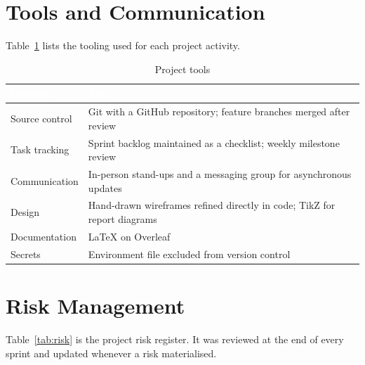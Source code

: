 \documentclass[12pt,a4paper,oneside]{report}
\begin{document}
\section{Tools and Communication}

Table~\ref{tab:tools} lists the tooling used for each project activity.

\begin{table}[H]
\centering
\caption{Project tools}
\label{tab:tools}
\small
\begin{tabularx}{\textwidth}{@{}p{3.6cm}X@{}}
\toprule
\rowcolor{tblhead} \textcolor{white}{\textbf{Purpose}} & \textcolor{white}{\textbf{Tool}} \\
\midrule
Source control & Git with a GitHub repository; feature branches merged after review \\
Task tracking  & Sprint backlog maintained as a checklist; weekly milestone review \\
Communication  & In-person stand-ups and a messaging group for asynchronous updates \\
Design         & Hand-drawn wireframes refined directly in code; TikZ for report diagrams \\
Documentation  & \LaTeX{} on Overleaf \\
Secrets        & Environment file excluded from version control \\
\bottomrule
\end{tabularx}
\end{table}

\section{Risk Management}

Table~\ref{tab:risk} is the project risk register. It was reviewed at the end of every sprint and updated whenever a risk materialised.
\end{document}

